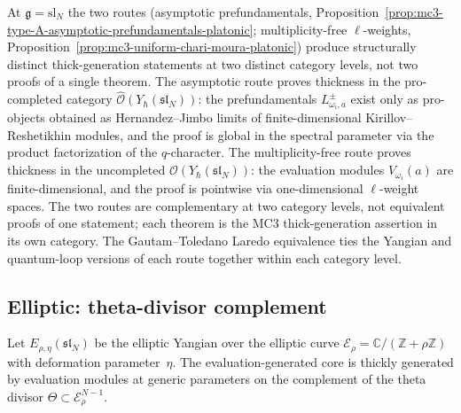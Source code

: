 \begin{remark}
\label{rem:chari-moura-vs-hernandez-jimbo}
At $\mathfrak{g} = \mathrm{sl}_N$ the two routes (asymptotic
prefundamentals,
Proposition~\ref{prop:mc3-type-A-asymptotic-prefundamentals-platonic};
multiplicity-free $\ell$-weights,
Proposition~\ref{prop:mc3-uniform-chari-moura-platonic}) produce
structurally distinct thick-generation statements at two distinct
category levels, not two proofs of a single theorem. The asymptotic
route proves thickness in the pro-completed category
$\widehat{\mathcal{O}}(Y_\hbar(\mathfrak{sl}_N))$: the
prefundamentals $L^\pm_{\omega_i,a}$ exist only as pro-objects
obtained as Hernandez--Jimbo limits of finite-dimensional
Kirillov--Reshetikhin modules, and the proof is global in the
spectral parameter via the product factorization of the
$q$-character. The multiplicity-free route proves thickness in the
uncompleted $\mathcal{O}(Y_\hbar(\mathfrak{sl}_N))$: the evaluation
modules $V_{\omega_i}(a)$ are finite-dimensional, and the proof is
pointwise via one-dimensional $\ell$-weight spaces. The two routes
are complementary at two category levels, not equivalent proofs of
one statement; each theorem is the MC3 thick-generation assertion
in its own category. The Gautam--Toledano Laredo equivalence ties
the Yangian and quantum-loop versions of each route together within
each category level.
\end{remark}

\subsection{Elliptic: theta-divisor complement}

\begin{proposition}
\label{prop:mc3-elliptic-theta-divisor-platonic}
%
%
%
Let $E_{\rho,\eta}(\mathfrak{sl}_N)$ be the elliptic Yangian over
the elliptic curve
$\mathcal{E}_\rho = \mathbb{C}/(\mathbb{Z} + \rho\mathbb{Z})$ with
deformation parameter~$\eta$. The evaluation-generated core is
thickly generated by evaluation modules at generic parameters on
the complement of the theta divisor
$\Theta \subset \mathcal{E}_\rho^{N-1}$.
\end{proposition}

